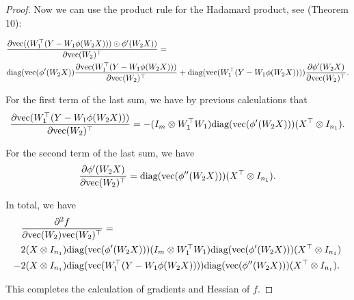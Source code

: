 \documentclass[a4paper,11pt]{article}
\newcommand{\1}{\mathbbm{1}}
\theoremstyle{plain}
\begin{document}
\begin{proof}
Now we can use the product rule for the Hadamard product, see \cite{magnus1985matrix} (Theorem 10):

\begin{align*}
    &\frac{\partial\textnormal{vec}((W_1^\top(Y-W_1 \phi(W_2 X))) \odot \phi'(W_2 X))}{\partial \text{vec}(W_2)^\top} = \\ & \textnormal{diag}(\text{vec}(\phi'(W_2 X)) \frac{\partial \text{vec}(W_1^\top(Y-W_1 \phi(W_2 X)))}{\partial \text{vec}(W_2)^\top} + \textnormal{diag}(\textnormal{vec}(W_1^\top(Y-W_1 \phi(W_2 X)))) \frac{\partial \phi'(W_2 X)}{\partial \text{vec}(W_2)^\top}.
\end{align*}

For the first term of the last sum, we have by previous calculations that
\begin{equation*}
    \frac{\partial \text{vec}(W_1^\top(Y-W_1 \phi(W_2 X)))}{\partial \text{vec}(W_2)^\top} = -(I_m \otimes 
 W_1^\top W_1) \textnormal{diag}(\textnormal{vec}(\phi'(W_2 X))) (X^\top \otimes I_{n_1}).
\end{equation*}

For the second term of the last sum, we have
\begin{equation*}
    \frac{\partial \phi'(W_2 X)}{\partial \text{vec}(W_2)^\top} = \textnormal{diag}(\text{vec}(\phi''(W_2 X))) (X^\top \otimes I_{n_1}).
\end{equation*}

In total, we have
\begin{align}
\label{eq:Hessian_2layer_22block}
    &\frac{\partial^2 f}{\partial \nonumber \textnormal{vec}(W_2) \text{vec}(W_2)^\top} =  \\& 2 (X \otimes I_{n_1}) \textnormal{diag}(\textnormal{vec}(\phi'(W_2 X))) \nonumber(I_m \otimes 
 W_1^\top W_1) \textnormal{diag}(\textnormal{vec}(\phi'(W_2 X))) (X^\top \otimes I_{n_1}) \\ - & 2 (X \otimes I_{n_1}) \textnormal{diag}(\textnormal{vec}(W_1^\top(Y-W_1 \phi(W_2 X))))\textnormal{diag}(\text{vec}(\phi''(W_2 X))) (X^\top \otimes I_{n_1}).
\end{align}

This completes the calculation of gradients and Hessian of $f$.



\end{proof}
\end{document}
